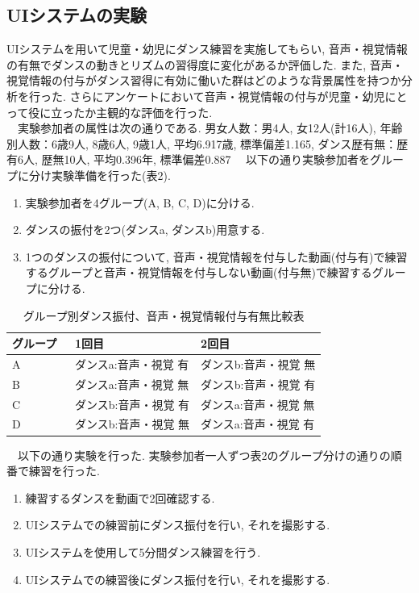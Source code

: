 \documentclass[technicalreport]{ieicej}
\begin{document}
\subsection{UIシステムの実験}
UIシステムを用いて児童・幼児にダンス練習を実施してもらい, 音声・視覚情報の有無でダンスの動きとリズムの習得度に変化があるか評価した. また, 音声・視覚情報の付与がダンス習得に有効に働いた群はどのような背景属性を持つか分析を行った. さらにアンケートにおいて音声・視覚情報の付与が児童・幼児にとって役に立ったか主観的な評価を行った. \\
　実験参加者の属性は次の通りである. 男女人数：男4人, 女12人(計16人), 年齢別人数：6歳9人, 8歳6人, 9歳1人, 平均6.917歳, 標準偏差1.165, ダンス歴有無：歴有6人, 歴無10人, 平均0.396年, 標準偏差0.887
　以下の通り実験参加者をグループに分け実験準備を行った(表2).
\begin{enumerate}[label=\arabic*., nosep]
  \item 実験参加者を4グループ(A, B, C, D)に分ける. 
  \item ダンスの振付を2つ(ダンスa, ダンスb)用意する. 
  \item 1つのダンスの振付について, 音声・視覚情報を付与した動画(付与有)で練習するグループと音声・視覚情報を付与しない動画(付与無)で練習するグループに分ける. 
\end{enumerate}
\begin{table}[t]
  \centering
  \caption{グループ別ダンス振付、音声・視覚情報付与有無比較表}
  \begin{tabularx}{\linewidth}{l p{0.4\linewidth} p{0.4\linewidth}}
    \toprule
      グループ & 1回目 & 2回目 \\
    \midrule
      A & ダンスa:音声・視覚 有 & ダンスb:音声・視覚 無 \\
      B & ダンスa:音声・視覚 無 & ダンスb:音声・視覚 有 \\
      C & ダンスb:音声・視覚 有 & ダンスa:音声・視覚 無 \\
      D & ダンスb:音声・視覚 無 & ダンスa:音声・視覚 有 \\
    \bottomrule
  \end{tabularx}
\end{table}
　以下の通り実験を行った. 実験参加者一人ずつ表2のグループ分けの通りの順番で練習を行った.
\begin{enumerate}[label=\arabic*., nosep]
  \item 練習するダンスを動画で2回確認する.  
  \item UIシステムでの練習前にダンス振付を行い, それを撮影する.
  \item UIシステムを使用して5分間ダンス練習を行う. 
  \item UIシステムでの練習後にダンス振付を行い, それを撮影する.
\end{enumerate}
\end{document}
